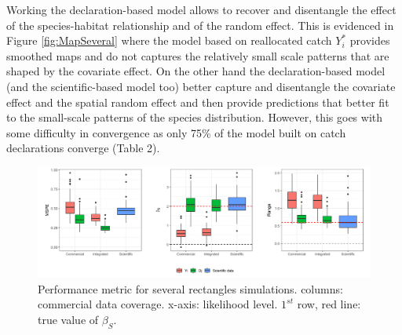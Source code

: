 \documentclass[
  english,
  man]{apa6}
\begin{document}
Working the declaration-based model allows to recover and disentangle the effect of the species-habitat relationship and of the random effect. This is evidenced in Figure \ref{fig:MapSeveral} where the model based on reallocated catch \(Y_i^*\) provides smoothed maps and do not captures the relatively small scale patterns that are shaped by the covariate effect. On the other hand the declaration-based model (and the scientific-based model too) better capture and disentangle the covariate effect and the spatial random effect and then provide predictions that better fit to the small-scale patterns of the species distribution. However, this goes with some difficulty in convergence as only 75\% of the model built on catch declarations converge (Table 2).

\begin{figure}
\centering
\includegraphics{images/Perf.metric_multiple_square.png}
\caption{\label{fig:PerfMetricSeveral} Performance metric for several rectangles simulations. columns: commercial data coverage. x-axis: likelihood level. \(1^{st}\) row, red line: true value of \(\beta_S\).}
\end{figure}
\end{document}
